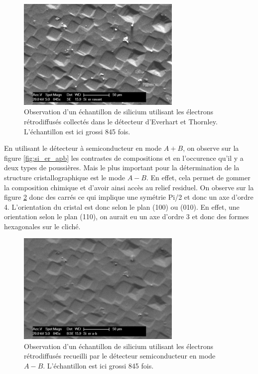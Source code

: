 \documentclass[a4paper,12pt]{article}
\newcommand\ett{Everhart et Thornley\xspace}
\begin{document}
\begin{figure}
\centering
\includegraphics[width=0.7\textwidth]{images/si_er_rasant.png}
\caption{Observation d'un échantillon de silicium utilisant les électrons rétrodiffusés collectés dans le détecteur d'\ett. L'échantillon est ici grossi 845 fois.}
\label{fig:si_er_rasant}
\end{figure}

En utilisant le détecteur à semiconducteur en mode $A+B$, on observe sur la figure \ref{fig:si_er_apb} les contrastes de compositions et en l'occurence qu'il y a deux types de poussières. Mais le plus important pour la détermination de la structure cristallographique est le mode $A-B$. En effet, cela permet de gommer la composition chimique et d'avoir ainsi accès au relief residuel. On observe sur la figure \ref{fig:si_er_amb} donc des carrés ce qui implique une symétrie Pi/2 et donc un axe d'ordre 4. L'orientation du cristal est donc selon le plan (100) ou (010). En effet, une orientation selon le plan (110), on aurait eu un axe d'ordre 3 et donc des formes hexagonales sur le cliché.
\begin{figure}
\centering
\includegraphics[width=0.7\textwidth]{images/si_er_amb.png}
\caption{Observation d'un échantillon de silicium utilisant les électrons rétrodiffusés recueilli par le détecteur semiconducteur en mode $A-B$. L'échantillon est ici grossi 845 fois.}
\label{fig:si_er_amb}
\end{figure}
\end{document}
